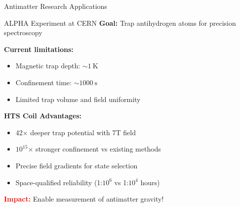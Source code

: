 \documentclass[aspectratio=169,xcolor={table,dvipsnames}]{beamer}
\newcommand{\highlight}[1]{\textcolor{red}{\textbf{#1}}}
\begin{document}
\begin{frame}{Antimatter Research Applications}
    \begin{block}{ALPHA Experiment at CERN}
        \textbf{Goal:} Trap antihydrogen atoms for precision spectroscopy
        
        \textbf{Current limitations:}
        \begin{itemize}
            \item Magnetic trap depth: $\sim 1~\text{K}$
            \item Confinement time: $\sim 1000~\text{s}$
            \item Limited trap volume and field uniformity
        \end{itemize}
    \end{block}
    
    \vspace{0.3cm}
    \textbf{HTS Coil Advantages:}
    \begin{itemize}
        \item 42× deeper trap potential with 7T field
        \item $10^{15}$× stronger confinement vs existing methods
        \item Precise field gradients for state selection
        \item Space-qualified reliability (1:$10^6$ vs 1:$10^4$ hours)
    \end{itemize}
    
    \vspace{0.3cm}
    \highlight{Impact:} Enable measurement of antimatter gravity!
\end{frame}
\end{document}
